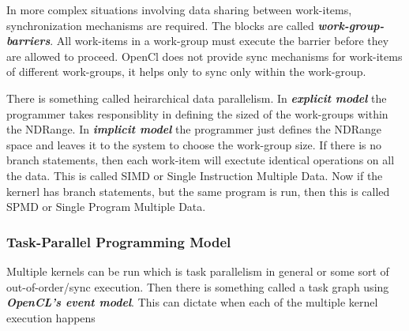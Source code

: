 \documentclass[10pt]{article}
\begin{document}
In more complex situations involving data sharing between work-items, synchronization mechanisms are required. The blocks are called \textit{\textbf{work-group-barriers}}. All work-items in a work-group must execute the barrier before they are allowed to proceed. OpenCl does not provide sync mechanisms for work-items of different work-groups, it helps only to sync only within the work-group.

There is something called heirarchical data parallelism. In \textit{\textbf{explicit model}} the programmer takes responsiblity in defining the sized of the work-groups within the NDRange. In \textit{\textbf{implicit model}} the programmer just defines the NDRange space and leaves it to the system to choose the work-group size. If there is no branch statements, then each work-item will exectute identical operations on all the data. This is called SIMD or Single Instruction Multiple Data. Now if the kernerl has branch statements, but the same program is run, then this is called SPMD or Single Program Multiple Data.

\subsubsection{Task-Parallel Programming Model}
Multiple kernels can be run which is task parallelism in general or some sort of out-of-order/sync execution. Then there is something called a task graph using \textit{\textbf{OpenCL's event model}}. This can dictate when each of the multiple kernel execution happens
\end{document}
